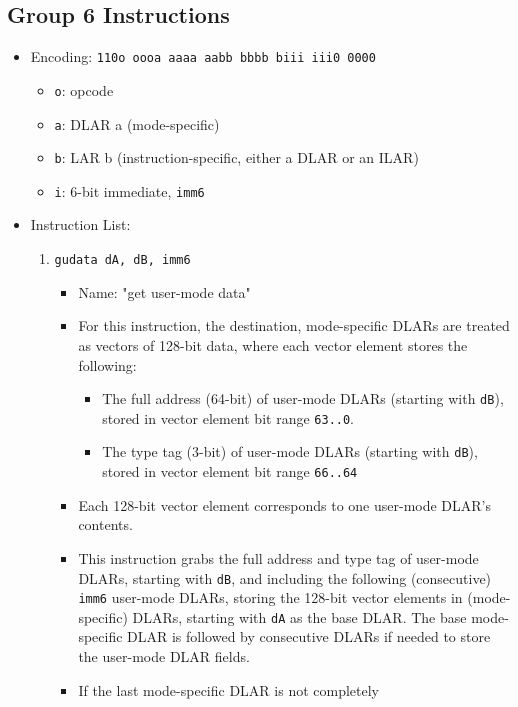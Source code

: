 \documentclass{article}
\begin{document}
	\subsection{Group 6 Instructions}
		\begin{itemize}
		\item Encoding:  \texttt{110o oooa aaaa aabb  bbbb biii iii0 0000}
			\begin{itemize}
			\item \texttt{o}:  opcode
			\item \texttt{a}:  DLAR a (mode-specific)
			\item \texttt{b}:  LAR b (instruction-specific, either a DLAR
				or an ILAR)
			\item \texttt{i}:  6-bit immediate, \texttt{imm6}
			\end{itemize}
		\item Instruction List:
			\begin{enumerate}
			\item \texttt{gudata dA, dB, imm6}
				\begin{itemize}
				\item Name:  "get user-mode data"
				\item For this instruction, the destination, mode-specific
					DLARs are treated as vectors of 128-bit data, where
					each vector element stores the following:
					\begin{itemize}
					\item The full address (64-bit) of user-mode DLARs
						(starting with \texttt{dB}), stored in vector
						element bit range \texttt{63..0}.
					\item The type tag (3-bit) of user-mode DLARs (starting
						with \texttt{dB}), stored in vector element bit
						range \texttt{66..64}
					\end{itemize}
				\item Each 128-bit vector element corresponds to one
					user-mode DLAR's contents.
				\item This instruction grabs the full address and type tag
					of user-mode DLARs, starting with \texttt{dB}, and
					including the following (consecutive) \texttt{imm6}
					user-mode DLARs, storing the 128-bit vector elements in
					(mode-specific) DLARs, starting with \texttt{dA} as the
					base DLAR.  The base mode-specific DLAR is followed by
					consecutive DLARs if needed to store the user-mode DLAR
					fields.
				\item If the last mode-specific DLAR is not completely

\end{itemize}
\end{enumerate}
\end{itemize}
\end{document}
